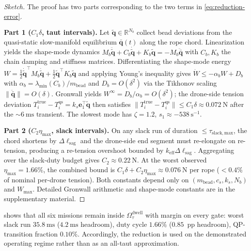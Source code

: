 \documentclass[lettersize,journal]{IEEEtran}
\newcommand{\R}{\mathbb{R}}
\begin{document}
\begin{proof}[Sketch]
The proof has two parts corresponding to the two terms in \eqref{eq:reduction-error}.

\noindent\textbf{Part 1 ($C_1\delta$, taut intervals).} Let $\tilde{\mathbf{q}}\in\R^{N_b}$ collect bead deviations from the quasi-static slow-manifold equilibrium $\bar{\mathbf{q}}(t)$ along the rope chord. Linearization yields the shape-mode dynamics $M_b\ddot{\tilde{\mathbf{q}}}+C_b\dot{\tilde{\mathbf{q}}}+K_b\tilde{\mathbf{q}}=-M_b\ddot{\bar{\mathbf{q}}}$ with $C_b,K_b$ the chain damping and stiffness matrices. Differentiating the shape-mode energy $W=\tfrac12\dot{\tilde{\mathbf{q}}}^\top M_b\dot{\tilde{\mathbf{q}}}+\tfrac12\tilde{\mathbf{q}}^\top K_b\tilde{\mathbf{q}}$ and applying Young's inequality gives $\dot W\le -\alpha_b W + D_b$ with $\alpha_b=\lambda_{\min}(C_b)/m_{\mathrm{bead}}$ and $D_b=O(\delta^2)$ via the Tikhonov scaling $\|\ddot{\bar{\mathbf{q}}}\|=O(\delta)$. Gronwall yields $W^\infty=D_b/\alpha_b=O(\delta^2)$; the drone-side tension deviation $T_i^{\mathrm{true}}-T_i^{\mathrm{qs}}=k_s\mathbf{e}_1^\top\tilde{\mathbf{q}}$ then satisfies $\|T_i^{\mathrm{true}}-T_i^{\mathrm{qs}}\|\le C_1\delta\approx\SI{0.072}{\newton}$ after the $\sim\SI{6}{\milli\second}$ transient. The slowest mode has $\zeta=1.2$, $s_1\approx-\SI{538}{\second^{-1}}$.

\noindent\textbf{Part 2 ($C_2\eta_{\max}$, slack intervals).} On any slack run of duration $\le\tau_{\mathrm{slack,max}}$, the chord shortens by $\Delta\ell_{\mathrm{sag}}$ and the drone-side end segment must re-elongate on re-tension, producing a re-tension overshoot bounded by $k_{\mathrm{eff}}\Delta\ell_{\mathrm{sag}}$. Aggregating over the slack-duty budget gives $C_2\approx\SI{0.22}{\newton}$. At the worst observed $\eta_{\max}=1.66\%$, the combined bound is $C_1\delta+C_2\eta_{\max}\approx\SI{0.076}{\newton}$ per rope ($<0.4\%$ of nominal per-drone tension). Both constants depend only on $(m_{\mathrm{bead}},c_s,k_s,N_b)$ and $W_{\max}$. Detailed Gronwall arithmetic and shape-mode constants are in the supplementary material.
\end{proof}

 shows that all six missions remain inside $\Omega_\tau^{\mathrm{dwell}}$ with margin on every gate: worst slack run $\SI{35.8}{\milli\second}$ ($\SI{4.2}{\milli\second}$ headroom), duty cycle $1.66\%$ ($0.85$~pp headroom), QP-transition fraction $0.10\%$. Accordingly, the reduction is used on the demonstrated operating regime rather than as an all-taut approximation.
\end{document}
